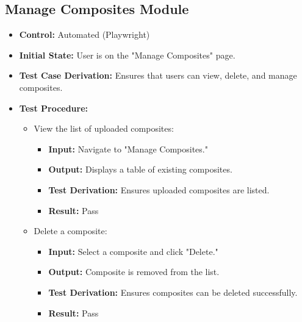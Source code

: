 \documentclass[12pt, titlepage]{article}
\begin{document}
\subsection{Manage Composites Module}
\begin{itemize}
    \item \textbf{Control: }Automated (Playwright)
    \item \textbf{Initial State: }User is on the "Manage Composites" page.
    \item \textbf{Test Case Derivation: }Ensures that users can view, delete, and manage composites.
    \item \textbf{Test Procedure: }
    \begin{itemize}
        \item View the list of uploaded composites:
        \begin{itemize}
            \item \textbf{Input: }Navigate to "Manage Composites."
            \item \textbf{Output: }Displays a table of existing composites.
            \item \textbf{Test Derivation: }Ensures uploaded composites are listed.
            \item \textbf{Result: }Pass
        \end{itemize}
        \item Delete a composite:
        \begin{itemize}
            \item \textbf{Input: }Select a composite and click "Delete."
            \item \textbf{Output: }Composite is removed from the list.
            \item \textbf{Test Derivation: }Ensures composites can be deleted successfully.
            \item \textbf{Result: }Pass
        \end{itemize}
    \end{itemize}
\end{itemize}
\end{document}
